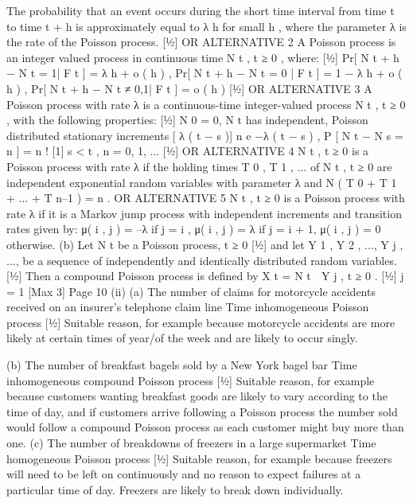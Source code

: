 \documentclass[a4paper,12pt]{article}
\begin{document}
The probability that an event occurs during the short time interval from time t to time t + h is approximately equal to λ h for small h , where the parameter λ is the rate of the Poisson process.
[1⁄2]
OR ALTERNATIVE 2
A Poisson process is an integer valued process in continuous time
{ N t , t ≥ 0} , where:
[1⁄2]
Pr[ N t + h − N t = 1| F t ] = λ h + o ( h ) ,
Pr[ N t + h − N t = 0 | F t ] = 1 − λ h + o ( h ) ,
Pr[ N t + h − N t ≠ 0,1| F t ] = o ( h )
[1⁄2]
OR ALTERNATIVE 3
A Poisson process with rate λ is a continuous-time integer-valued
process N t , t ≥ 0 , with the following properties:
[1⁄2]
N 0 = 0,
N t has independent, Poisson distributed stationary increments
[ λ ( t − s )] n e −λ ( t − s )
,
P [ N t − N s = n ] =
n !
[1]
s < t , n = 0, 1, ...
[1⁄2]
OR ALTERNATIVE 4
{ N t , t ≥ 0} is a Poisson process with rate λ if the holding times T 0 , T 1 , ...
of
{ N t , t ≥ 0} are independent exponential random variables with
parameter λ and
N ( T 0 + T 1 + ... + T n–1 ) = n .
OR ALTERNATIVE 5
{ N t , t ≥ 0} is a Poisson process with rate λ if it is a Markov jump
process with independent increments and transition rates given by:
μ( i , j ) = –λ if j = i ,
μ( i , j ) = λ if j = i + 1,
μ( i , j ) = 0 otherwise.
(b)
Let N t be a Poisson process, t ≥ 0 [1⁄2]
and let Y 1 , Y 2 , ..., Y j , ..., be a sequence of independently and
identically distributed random variables. [1⁄2]
Then a compound Poisson process is defined by
X t =
N t
 Y j , t ≥ 0 .
[1⁄2]
j = 1
[Max 3]
Page 10 %
(ii)
(a)
The number of claims for motorcycle accidents received on an
insurer’s telephone claim line
Time inhomogeneous Poisson process
[1⁄2]
Suitable reason, for example because motorcycle accidents are more
likely at certain times of year/of the week and are likely to occur
singly.

(b)
The number of breakfast bagels sold by a New York bagel bar
Time inhomogeneous compound Poisson process
[1⁄2]
Suitable reason, for example because customers wanting breakfast goods are likely to vary according to the time of day, and if customers
arrive following a Poisson process the number sold would follow a compound Poisson process as each customer might buy more than one.
(c)
The number of breakdowns of freezers in a large supermarket
Time homogeneous Poisson process
[1⁄2]
Suitable reason, for example because freezers will need to be left on continuously and no reason to expect failures at a particular time of day. Freezers are likely to break down individually.
\end{document}
